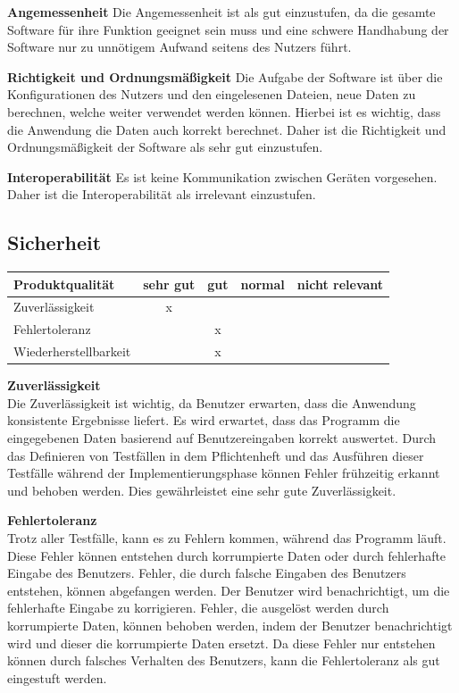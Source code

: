 \documentclass[parskip=full]{scrartcl} %
\begin{document}
\textbf{Angemessenheit}
\newline
Die Angemessenheit ist als gut einzustufen, da die gesamte Software für ihre Funktion geeignet sein muss und eine schwere Handhabung der Software nur zu unnötigem Aufwand seitens des Nutzers führt.



\textbf{Richtigkeit und Ordnungsmäßigkeit}
\newline
Die Aufgabe der Software ist über die Konfigurationen des Nutzers und den eingelesenen Dateien, neue Daten zu berechnen, welche weiter verwendet werden können. Hierbei ist es wichtig, dass die Anwendung die Daten auch korrekt berechnet. Daher ist die Richtigkeit und Ordnungsmäßigkeit der Software als sehr gut einzustufen.

\textbf{Interoperabilität}
\newline
Es ist keine Kommunikation zwischen Geräten vorgesehen. Daher ist die Interoperabilität als irrelevant einzustufen.


\newpage 

\subsection{Sicherheit}

    \begin{tabular}{|l| c| c| c| c|}
    \hline
        Produktqualität & sehr gut & gut & normal & nicht relevant \\
    \hline
        Zuverlässigkeit & x & & &\\
    \hline
        Fehlertoleranz & & x & &\\
    \hline
        Wiederherstellbarkeit & & x & &\\
    \hline
     \end{tabular}

\textbf{Zuverlässigkeit\\}
Die Zuverlässigkeit ist wichtig, da Benutzer erwarten, dass die Anwendung konsistente Ergebnisse liefert.
Es wird erwartet, dass das Programm die eingegebenen Daten basierend auf Benutzereingaben korrekt auswertet.
Durch das Definieren von Testfällen in dem Pflichtenheft und das Ausführen dieser Testfälle während der Implementierungsphase können Fehler frühzeitig erkannt und behoben werden.
Dies gewährleistet eine sehr gute Zuverlässigkeit.

\textbf{Fehlertoleranz\\}
Trotz aller Testfälle, kann es zu Fehlern kommen, während das Programm läuft. Diese Fehler können entstehen durch korrumpierte Daten oder durch fehlerhafte Eingabe des Benutzers.
Fehler, die durch falsche Eingaben des Benutzers entstehen, können abgefangen werden. Der Benutzer wird benachrichtigt, um die fehlerhafte Eingabe zu korrigieren.
Fehler, die ausgelöst werden durch korrumpierte Daten, können behoben werden, indem der Benutzer benachrichtigt wird und dieser die korrumpierte Daten ersetzt.
Da diese Fehler nur entstehen können durch falsches Verhalten des Benutzers, kann die Fehlertoleranz als gut eingestuft werden.
\end{document}
